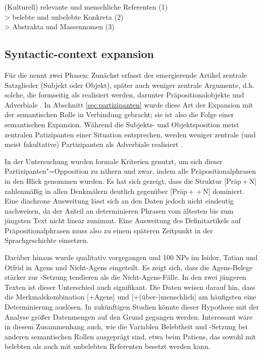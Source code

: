 \begin{exe}
	\ex \label{ex:belebtheitsskala} (Kulturell) relevante und menschliche Referenten (1)\\>  belebte und unbelebte Konkreta (2)\\> Abstrakta und Massennomen (3)
	\end{exe}


\subsection{Syntactic-context expansion} \label{sec:syn-expansion}

Für die  nennt \textcite{Himmelmann2004} zwei Phasen: Zunächst erfasst der emergierende Artikel zentrale Satzglieder (Subjekt oder Objekt), später auch weniger zentrale Argumente, d.h. solche, die formseitig als  realisiert werden, darunter Präpositionalobjekte und Adverbiale \parencite{Himmelmann1998}. In Abschnitt \ref{sec:partizipanten} wurde diese Art der Expansion mit der semantischen Rolle in Verbindung gebracht; sie ist also  die Folge einer semantischen Expansion. Während die Subjekts- und Objektsposition meist zentralen Patizipanten einer Situation entsprechen, werden weniger zentrale (und meist fakultative) Partizipanten als Adverbiale realisiert \parencite{Lehmann2004a}. 

In der Untersuchung wurden formale Kriterien genutzt, um sich dieser Partizipanten"=Opposition zu nähern und zwar, indem alle Präpositionalphrasen in den Blick genommen wurden. Es hat sich gezeigt, dass die Struktur [Präp\,+\,N] zahlenmäßig in allen Denkmälern deutlich gegenüber [Präp\,+\,\,+\,N] dominiert. Eine diachrone Ausweitung lässt sich an den Daten jedoch nicht eindeutig nachweisen, da der Anteil an determinieren Phrasen vom ältesten bis zum jüngsten Text nicht linear zunimmt. Eine Ausweitung des Definitartikels auf Präpositionalphrasen muss also zu einem späteren Zeitpunkt in der Sprachgeschichte einsetzen. 

Darüber hinaus wurde qualitativ vorgegangen und 100 NPs im Isidor, Tatian und Otfrid in Agens und Nicht-Agens eingeteilt. Es zeigt sich, dass die Agens-Belege stärker zur -Setzung tendieren als die Nicht-Agens-Fälle. In den zwei jüngeren Texten ist dieser Unterschied auch signifikant. Die Daten weisen darauf hin, dass die Merkmalskombination [+Agens] und [+(über-)menschlich] am häufigsten eine Determinierung auslösen. In zukünftigen Studien könnte dieser Hypothese mit der Analyse größer Datenmengen auf den Grund gegangen werden. Interessant wäre in diesem Zusammenhang auch, wie die Variablen Belebtheit und -Setzung bei anderen semantischen Rollen ausgeprägt sind, etwa beim Patiens, das sowohl mit belebten als auch mit unbelebten Referenten besetzt werden kann.   

